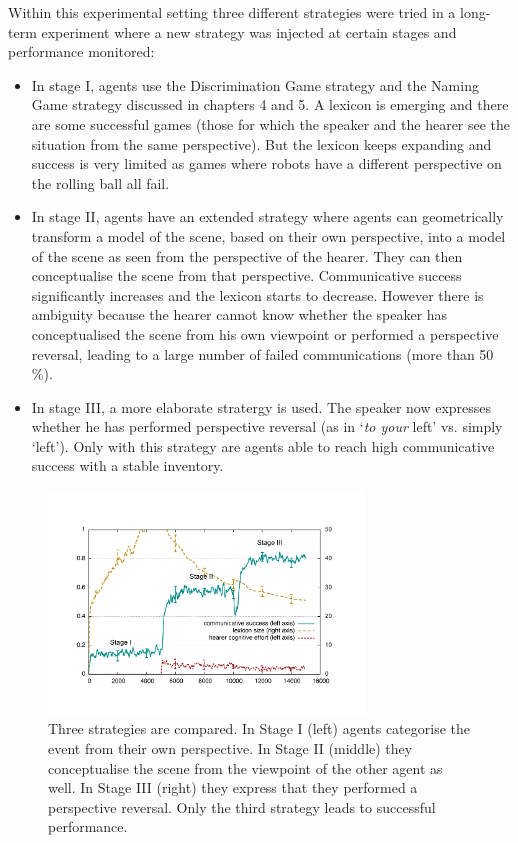 Within this experimental setting three different strategies were tried in a long-term experiment where
a new strategy was injected at certain stages and performance monitored: 
\begin{itemize}
\item In stage I, agents use 
the Discrimination Game strategy and the Naming Game strategy discussed in chapters 4 and 5. A 
lexicon is emerging and there are some successful games (those for which the speaker and the hearer see the situation from 
the same perspective). But the lexicon keeps expanding and success is very limited as games where robots have a different 
perspective on the rolling ball all fail. 
\item In stage II, agents have an extended 
strategy where agents can geometrically transform a model of the scene, based on their own perspective, into a model of the scene 
as seen from the perspective of the hearer. They can then conceptualise the scene from that perspective. 
Communicative success significantly increases and the 
lexicon starts to decrease. However there is ambiguity because the hearer cannot know whether
the speaker has conceptualised the 
scene from his own viewpoint or performed a perspective reversal, leading to a large number of failed communications 
(more than 50 \%). 
\item In stage III, a more elaborate stratergy is used. The speaker now expresses whether he has performed perspective 
reversal (as in `{\itshape to your} left' vs. simply `left'). Only with this strategy are agents able to reach high 
communicative success with a stable inventory. 
\end{itemize}


\begin{figure}[t]
\centerline{
\includegraphics[width=0.75\textwidth]{chap10/figs/stages.pdf}}
\caption{\label{fig:stages} 
Three strategies are compared. In Stage I (left) agents categorise the event from their 
own perspective. In Stage II (middle) they conceptualise the scene from the viewpoint of the other agent as well. In Stage III (right) 
they express that they performed a perspective reversal. Only the third strategy leads to successful performance.} 
\end{figure}

